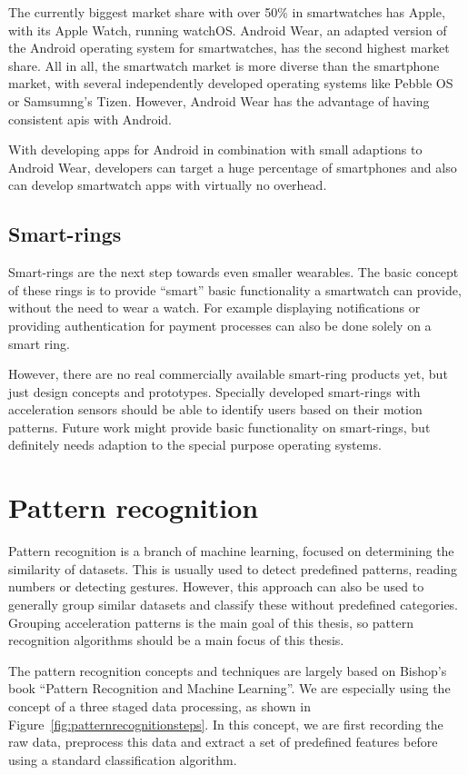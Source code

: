 The currently biggest market share with over 50\% in smartwatches has Apple, with its Apple Watch, running watchOS. Android Wear, an adapted version of the Android operating system for smartwatches, has the second highest market share. All in all, the smartwatch market is more diverse than the smartphone market, with several independently developed operating systems like Pebble OS or Samsumng's Tizen. However, Android Wear has the advantage of having consistent \Glspl{api} with Android. 

With developing \glspl{app} for Android in combination with small adaptions to Android Wear, developers can target a huge percentage of smartphones and also can develop smartwatch apps with virtually no overhead.

\subsection{Smart-rings}
Smart-rings are the next step towards even smaller wearables. The basic concept of these rings is to provide ``smart'' basic functionality a smartwatch can provide, without the need to wear a watch. For example displaying notifications or providing authentication for payment processes can also be done solely on a smart ring.

However, there are no real commercially available smart-ring products yet, but just design concepts and prototypes. Specially developed smart-rings with acceleration sensors should be able to identify users based on their motion patterns. Future work might provide basic functionality on smart-rings, but definitely needs adaption to the special purpose operating systems. 

\section{Pattern recognition}
Pattern recognition is a branch of machine learning, focused on determining the similarity of datasets. This is usually used to detect predefined patterns, \eg reading numbers or detecting gestures. However, this approach can also be used to generally group similar datasets and classify these without predefined categories. Grouping acceleration patterns is the main goal of this thesis, so pattern recognition algorithms should be a main focus of this thesis.

The pattern recognition concepts and techniques are largely based on Bishop's book ``Pattern Recognition and Machine Learning''\cite{bishop2006pattern}. We are especially using the concept of a three staged data processing, as shown in Figure~\ref{fig:patternrecognitionsteps}. In this concept, we are first recording the raw data, preprocess this data and extract a set of predefined features before using a standard classification algorithm.

